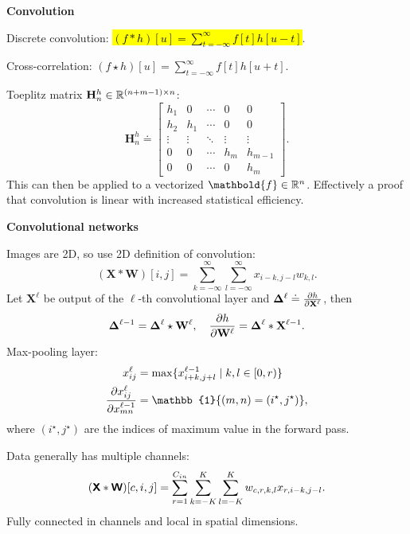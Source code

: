 \documentclass[10pt]{article}
\newenvironment{topic}[1]
{\textbf{\sffamily \footnotesize \colorbox{black}{\rlap{\textbf{\textcolor{white}{#1}}}\hspace{\linewidth}\hspace{-2\fboxsep}}}}
{}
\newenvironment{subtopic}[1]
{\begin{center}\textbf{\footnotesize \sffamily #1}\end{center}}
{}
\renewcommand{\mat}[1]{\ensuremath{\mathbf{#1}}}
\renewcommand{\vec}[1]{\ensuremath{\mathbold{#1}}}
\begin{document}
\begin{multicols*}{3}
\begin{topic}{Convolutional networks}
\begin{subtopic}{Convolution}
            Discrete convolution: \hl{$(f * h)[u] = \sum_{t=-\infty}^{\infty} f[t]h[u-t]$}.

            Cross-correlation: $(f \star h)[u] = \sum_{t=-\infty}^{\infty} f[t] h[u+t]$.

            Toeplitz matrix $\mat{H}_n^h \in \R^{(n+m-1)\times n}$: \[
                \mat{H}_n^h \doteq
                \begin{bmatrix}
                    h_1    & 0      & \cdots & 0      & 0       \\
                    h_2    & h_1    & \cdots & 0      & 0       \\
                    \vdots & \vdots & \ddots & \vdots & \vdots  \\
                    0      & 0      & \cdots & h_m    & h_{m-1} \\
                    0      & 0      & \cdots & 0      & h_m
                \end{bmatrix}.
            \]
            This can then be applied to a vectorized $\vec{f} \in \R^n$. Effectively a proof that convolution
            is linear with increased statistical efficiency.
        \end{subtopic}

        \begin{subtopic}{Convolutional networks}
            Images are 2D, so use 2D definition of convolution: \[
                (\mat{X} * \mat{W})[i,j] = \sum_{k=-\infty}^{\infty} \sum_{l=-\infty}^{\infty} x_{i-k,j-l} w_{k,l}.
            \]
            Let $\mat{X}^{\ell}$ be output of the $\ell$-th convolutional layer and $\mat{\Delta}^{\ell} \doteq
                \pdv{h}{\mat{X}^{\ell}}$, then \[
                \mat{\Delta}^{\ell-1} = \mat{\Delta}^{\ell} \star \mat{W}^{\ell}, \quad \pdv{h}{\mat{W}^{\ell}} = \mat{\Delta}^{\ell} * \mat{X}^{\ell-1}.
            \]
            Max-pooling layer:
            \begin{align*}
                x^{\ell}_{ij}                        & = \max \{ x^{\ell-1}_{i+k,j+l} \mid k, l \in [0,r) \} \\
                \pdv{x_{ij}^{\ell}}{x^{\ell-1}_{mn}} & = \mathbb{1}\{ (m,n) = (i^\star,j^\star) \},
            \end{align*}
            where $(i^\star, j^\star)$ are the indices of maximum value in the forward pass.

            Data generally has multiple channels: \[
                (\bm{\mathsf{X}} * \bm{\mathsf{W}})[c,i,j] = \sum_{r=1}^{C_{in}} \sum_{k=-K}^{K} \sum_{l=-K}^{K} w_{c,r,k,l} x_{r,i-k,j-l}.
            \]
            Fully connected in channels and local in spatial dimensions.


\end{subtopic}
\end{topic}
\end{multicols*}
\end{document}
